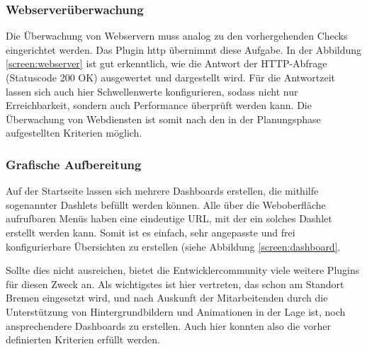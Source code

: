 \subsubsection{Webserverüberwachung}
\label{sec:ÜberwachungWebserver}
Die Überwachung von Webservern muss analog zu den vorhergehenden Checks eingerichtet werden. Das Plugin \glqq{}http\grqq{} übernimmt diese Aufgabe.  In der Abbildung \ref{screen:webserver} ist gut erkenntlich, wie die Antwort der HTTP-Abfrage (Statuscode 200 OK) ausgewertet und dargestellt wird. Für die Antwortzeit lassen sich auch hier Schwellenwerte konfigurieren, sodass nicht nur Erreichbarkeit, sondern auch Performance überprüft werden kann. Die Überwachung von Webdiensten ist somit nach den in der Planungsphase aufgestellten Kriterien möglich.

\subsubsection{Grafische Aufbereitung}
\label{sec:GrafischeAufbereitung}
Auf der Startseite lassen sich mehrere Dashboards erstellen, die mithilfe sogenannter \glqq{}Dashlets\grqq{} befüllt werden können. Alle über die Weboberfläche aufrufbaren Menüs haben eine eindeutige URL, mit der ein solches Dashlet erstellt werden kann. Somit ist es einfach, sehr angepasste  und frei konfigurierbare Übersichten zu erstellen (siehe Abbildung \ref{screen:dashboard}.

Sollte dies nicht ausreichen, bietet die Entwicklercommunity viele weitere Plugins für diesen Zweck an. Als wichtigstes ist hier  vertreten, das schon am Standort Bremen eingesetzt wird, und nach Auskunft der Mitarbeitenden durch die Unterstützung von Hintergrundbildern und Animationen in der Lage ist, noch ansprechendere Dashboards zu erstellen. Auch hier konnten also die vorher definierten Kriterien erfüllt werden.